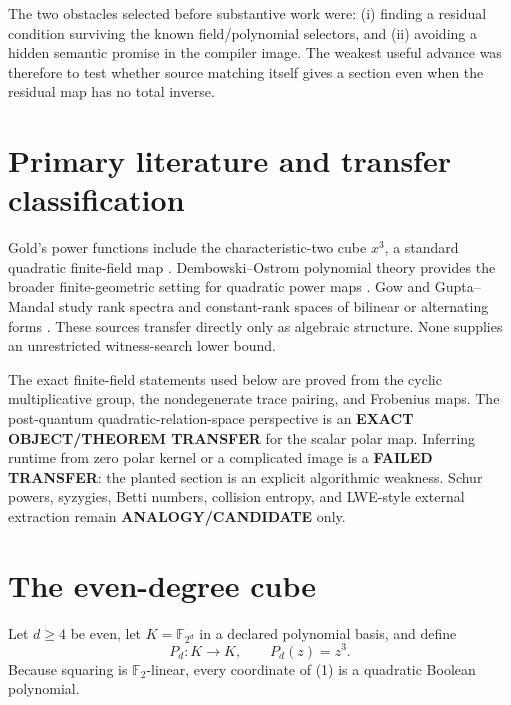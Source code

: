 \documentclass[11pt]{article}
\newcommand{\F}{\mathbb F_2}
\begin{document}
The two obstacles selected before substantive work were: (i) finding a
residual condition surviving the known field/polynomial selectors, and (ii)
avoiding a hidden semantic promise in the compiler image.  The weakest useful
advance was therefore to test whether source matching itself gives a section
even when the residual map has no total inverse.

\section{Primary literature and transfer classification}
Gold's power functions include the characteristic-two cube $x^3$, a standard
quadratic finite-field map \cite{Gold}.  Dembowski--Ostrom polynomial theory
provides the broader finite-geometric setting for quadratic power maps
\cite{DO}.  Gow and Gupta--Mandal study rank spectra and constant-rank spaces
of bilinear or alternating forms \cite{Gow,GM}.  These sources transfer
directly only as algebraic structure.  None supplies an unrestricted
witness-search lower bound.

The exact finite-field statements used below are proved from the cyclic
multiplicative group, the nondegenerate trace pairing, and Frobenius maps.
The post-quantum quadratic-relation-space perspective is an
\textbf{EXACT OBJECT/THEOREM TRANSFER} for the scalar polar map.  Inferring
runtime from zero polar kernel or a complicated image is a
\textbf{FAILED TRANSFER}: the planted section is an explicit algorithmic
weakness.  Schur powers, syzygies, Betti numbers, collision entropy, and
LWE-style external extraction remain \textbf{ANALOGY/CANDIDATE} only.

\section{The even-degree cube}
Let $d\ge4$ be even, let $K=\mathbb F_{2^d}$ in a declared polynomial basis,
and define
\[
P_d:K\to K,\qquad P_d(z)=z^3.                            \tag{1}
\]
Because squaring is $\F$-linear, every coordinate of (1) is a quadratic
Boolean polynomial.
\end{document}
